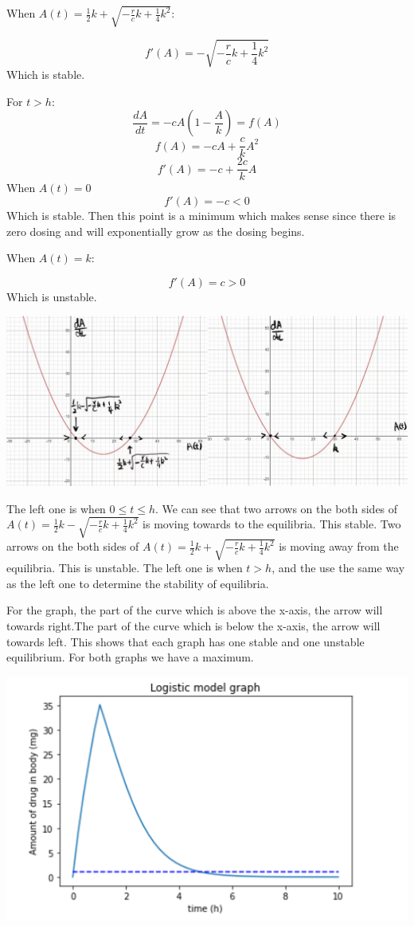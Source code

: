 \documentclass{article}
\begin{document}
When $A(t)=\frac{1}{2}k+\sqrt{-\frac{r}{c}k+\frac{1}{4}k^2}$:

$$
f'(A) = -\sqrt{-\frac{r}{c}k+\frac{1}{4}k^2}
$$
Which is stable. 

For $t > h$:
$$
\frac{dA}{dt}= - cA(1-\frac{A}{k}) = f(A)
$$
$$
f(A) = - cA + \frac{c}{k}A^2
$$
$$
f'(A) = - c + \frac{2c}{k}A
$$
When $A(t)= 0$
$$
f'(A) = -c < 0 
$$
Which is stable. Then this point is a minimum which makes sense since there is zero dosing and will exponentially grow as the dosing begins. 

When $A(t)= k$:

$$
f'(A) = c > 0
$$
Which is unstable.

\begin{center}
    \includegraphics[scale = 0.2]{stability_of_logistic.jpg}
\end{center}

The left one is when $0 \leq t \leq h$. We can see that two arrows on the both sides of  $A(t)=\frac{1}{2}k-\sqrt{-\frac{r}{c}k+\frac{1}{4}k^2}$ is moving towards to the equilibria. This stable. Two arrows on the both sides of  $A(t)=\frac{1}{2}k+\sqrt{-\frac{r}{c}k+\frac{1}{4}k^2}$ is moving away from the equilibria. This is unstable. The left one is when $t > h$, and the use the same way as the left one to determine the stability of equilibria.

For the graph, the part of the curve which is above the x-axis, the arrow will towards right.The part of the curve which is below the x-axis, the arrow will towards left. This shows that each graph has one stable and one unstable equilibrium. For both graphs we have a maximum. 
\begin{center}
    \includegraphics[scale = 0.7]{LogisticModelGraph.png}
\end{center}
\end{document}

